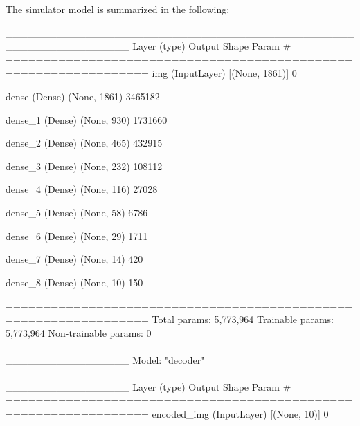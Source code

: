 The simulator model is summarized in the following:
\begin{asexample}

_________________________________________________________________
 Layer (type)                Output Shape              Param #   
=================================================================
 img (InputLayer)            [(None, 1861)]            0         
                                                                 
 dense (Dense)               (None, 1861)              3465182   
                                                                 
 dense_1 (Dense)             (None, 930)               1731660   
                                                                 
 dense_2 (Dense)             (None, 465)               432915    
                                                                 
 dense_3 (Dense)             (None, 232)               108112    
                                                                 
 dense_4 (Dense)             (None, 116)               27028     
                                                                 
 dense_5 (Dense)             (None, 58)                6786      
                                                                 
 dense_6 (Dense)             (None, 29)                1711      
                                                                 
 dense_7 (Dense)             (None, 14)                420       
                                                                 
 dense_8 (Dense)             (None, 10)                150       
                                                                 
=================================================================
Total params: 5,773,964
Trainable params: 5,773,964
Non-trainable params: 0
_________________________________________________________________
Model: "decoder"
_________________________________________________________________
 Layer (type)                Output Shape              Param #   
=================================================================
 encoded_img (InputLayer)    [(None, 10)]              0         
                                                                 

\end{asexample}

